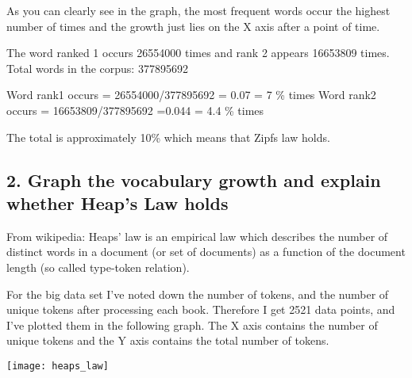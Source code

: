 \documentclass[12pt,letterpaper]{article}
\begin{document}
As you can clearly see in the graph, the most frequent words occur the highest number of times and the growth just lies on the X axis after a point of time.

The word ranked 1 occurs 26554000 times and rank 2 appears 16653809 times. Total words in the corpus: 377895692

Word rank1 occurs = 26554000/377895692 = 0.07 = 7 \% times
Word rank2 occurs = 16653809/377895692 =0.044 = 4.4 \% times

The total is approximately 10\% which means that Zipfs law holds. 

\subsection*{2. Graph the vocabulary growth and explain whether Heap's Law holds}
From wikipedia: Heaps' law  is an empirical law which describes the number of distinct words in a document (or set of documents) as a function of the document length (so called type-token relation).

For the big data set I've noted down the number of tokens, and the number of unique tokens after processing each book. Therefore I get 2521 data points, and I've plotted them in the following graph. The X axis contains the number of unique tokens and the Y axis contains the total number of tokens.

\begin{center}
\texttt{[image: heaps\_law]}
\end{center}
\end{document}
